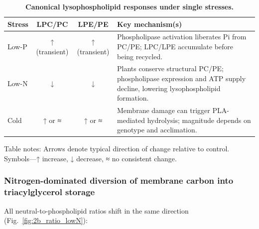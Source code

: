 \documentclass[10pt,letterpaper]{article}
\begin{document}
\begin{table}[!ht]
  \begin{adjustwidth}{-2.25in}{0in} %
    \centering
    \caption{{\bf Canonical lysophospholipid responses under single stresses.}}
    \begin{tabular}{|l|c|c|p{4.0in}|}
      \hline
      \textbf{Stress} & \textbf{LPC/PC} & \textbf{LPE/PE} & \textbf{Key mechanism(s)} \\ \hline
      Low-P  & ↑ (transient) & ↑ (transient) &
      Phospholipase activation liberates Pi from PC/PE; LPC/LPE accumulate
      before being recycled. \\ \hline
      Low-N  & ↓ & ↓ &
      Plants conserve structural PC/PE; phospholipase expression and ATP supply
      decline, lowering lysophospholipid formation. \\ \hline
      Cold   & ↑ or ≈ & ↑ or ≈ &
      Membrane damage can trigger PLA-mediated hydrolysis; magnitude depends on
      genotype and acclimation. \\ \hline
    \end{tabular}
    \begin{flushleft}
      Table notes: Arrows denote typical direction of change relative to control.
      Symbols—↑ increase, ↓ decrease, ≈ no consistent change.
    \end{flushleft}
    \label{table:lyso_responses}
  \end{adjustwidth}
\end{table}




\subsubsection*{Nitrogen-dominated diversion of membrane carbon into triacylglycerol storage}

All neutral-to-phospholipid ratios shift in the same direction
(Fig.~\ref{fig:2b_ratio_lowN}):
\end{document}
